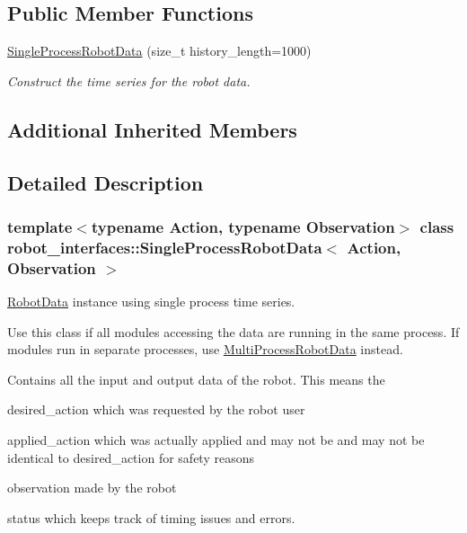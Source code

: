 \subsection*{Public Member Functions}
\begin{DoxyCompactItemize}
\item 
\hyperlink{classrobot__interfaces_1_1SingleProcessRobotData_adcb9896c90464e27fb1cd2f303ca7cef}{Single\+Process\+Robot\+Data} (size\+\_\+t history\+\_\+length=1000)
\begin{DoxyCompactList}\small\item\em Construct the time series for the robot data. \end{DoxyCompactList}\end{DoxyCompactItemize}
\subsection*{Additional Inherited Members}


\subsection{Detailed Description}
\subsubsection*{template$<$typename Action, typename Observation$>$\newline
class robot\+\_\+interfaces\+::\+Single\+Process\+Robot\+Data$<$ Action, Observation $>$}

\hyperlink{classrobot__interfaces_1_1RobotData}{Robot\+Data} instance using single process time series. 

Use this class if all modules accessing the data are running in the same process. If modules run in separate processes, use \hyperlink{classrobot__interfaces_1_1MultiProcessRobotData}{Multi\+Process\+Robot\+Data} instead.

Contains all the input and output data of the robot. This means the
\begin{DoxyItemize}
\item {\ttfamily desired\+\_\+action} which was requested by the robot user
\item {\ttfamily applied\+\_\+action} which was actually applied and may not be and may not be identical to desired\+\_\+action for safety reasons
\item {\ttfamily observation} made by the robot
\item {\ttfamily status} which keeps track of timing issues and errors.
\end{DoxyItemize}

